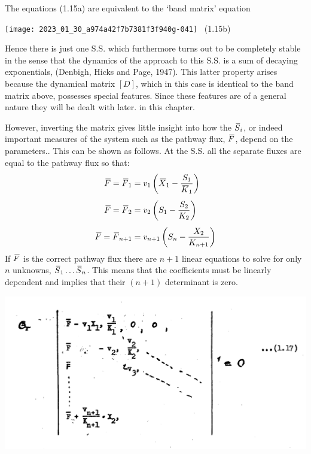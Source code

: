 The equations (1.15a) are equivalent to the `band matrix' equation

\begin{center}
\texttt{[image: 2023\_01\_30\_a974a42f7b7381f3f940g-041]}  \mbox{\hspace{15pt} (1.15b)}
\end{center}
Hence there is just one S.S. which furthermore turns out to be completely stable in the sense that the dynamics of the approach to this S.S. is a sum of decaying exponentials, (Denbigh, Hicks and Page, 1947). This latter property arises because the dynamical matrix $[D]$, which in this case is identical to the band matrix above, possesses special features. Since these features are of a general nature they will be dealt with later. in this chapter.

However, inverting the matrix gives little insight into how the $\,\overline{\!{S}}_{i}$, or indeed important measures of the system such as the pathway flux, $\,\overline{\!{F}}$, depend on the parameters.. This can be shown as follows. At the S.S. all the separate fluxes are equal to the pathway flux so that:
%
\begin{equation}
\begin{aligned}
\olsi{F}=\olsi{F}_{1} &= v_{1}\left(\olsi{X}_{1}-\frac{S_{1}}{\olsi{K}_{1}}\right) \\[4pt]
\olsi{F}=\olsi{F}_{2} &= v_{2}\left(S_{1}-\frac{S_{2}}{K_{2}}\right) \\[4pt]
\olsi{F}=\olsi{F}_{n+1} &= v_{n+1}\left(S_{n}-\frac{X_{2}}{K_{n+1}}\right)
\end{aligned}
\label{eqn:116}
\end{equation}
%
If $\,\overline{\!{F}}$ is the correct pathway flux there are $n+1$ linear equations to solve for only $n$ unknowns, $\,\overline{\!{S}}_{1} \ldots \,\overline{\!{S}}_{n}$. This means that the coefficients must be linearly dependent and implies that their $(n+1)$ determinant is zero.
%

\includegraphics[scale=0.5]{figure1_17.png}

